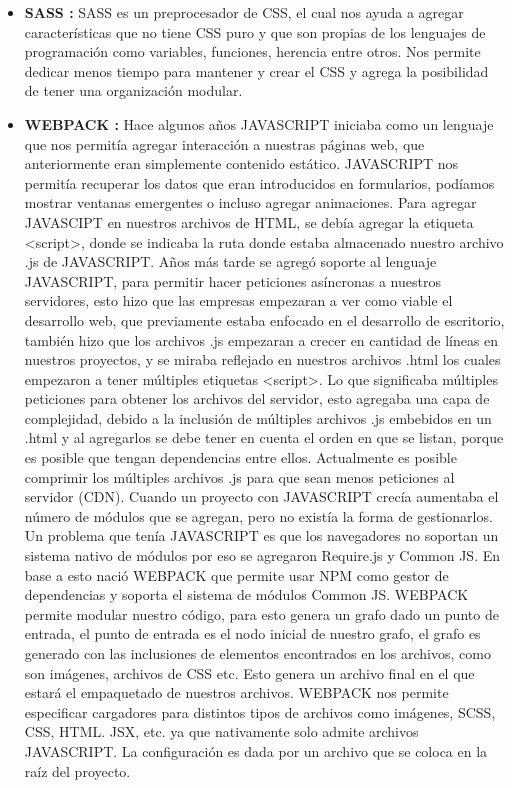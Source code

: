 \begin{itemize}
   \item \textbf{ SASS :} SASS es un preprocesador de CSS, el cual nos ayuda a agregar características que no tiene CSS puro y que son propias de los lenguajes de programación como variables, funciones, herencia entre otros. Nos permite dedicar menos tiempo para mantener y crear el CSS y agrega la posibilidad de tener una organización modular. 
   
   \item \textbf{ WEBPACK :} Hace algunos años JAVASCRIPT iniciaba como un lenguaje que nos permitía agregar interacción a nuestras páginas web, que anteriormente eran simplemente contenido estático.  JAVASCRIPT nos permitía recuperar los datos que eran introducidos en formularios, podíamos mostrar ventanas emergentes o incluso agregar animaciones. Para agregar JAVASCIPT en nuestros archivos de HTML, se debía agregar la etiqueta <script>, donde se indicaba la ruta donde estaba almacenado nuestro archivo .js de JAVASCRIPT.  
Años más tarde se agregó soporte al lenguaje JAVASCRIPT, para permitir hacer peticiones asíncronas a nuestros servidores, esto hizo que las empresas empezaran a ver como viable el desarrollo web, que previamente estaba enfocado en el desarrollo de escritorio, también hizo que los archivos .js empezaran a crecer en cantidad de líneas en nuestros proyectos, y se miraba reflejado en nuestros archivos .html los cuales empezaron a tener múltiples etiquetas <script>. Lo que significaba múltiples peticiones para obtener los archivos del servidor, esto agregaba una capa de complejidad, debido a la inclusión de múltiples archivos .js embebidos en un .html y al agregarlos se debe tener en cuenta el orden en que se listan, porque es posible que tengan dependencias entre ellos. Actualmente es posible comprimir los múltiples archivos .js para que sean menos peticiones al servidor (CDN).  Cuando un proyecto con JAVASCRIPT crecía aumentaba el número de módulos que se agregan, pero no existía la forma de gestionarlos. Un problema que tenía JAVASCRIPT es que los navegadores no soportan un sistema nativo de módulos por eso se agregaron Require.js y Common JS. 
En base a esto nació WEBPACK que permite usar NPM como gestor de dependencias y soporta el sistema de módulos Common JS.
WEBPACK permite modular nuestro código, para esto genera un grafo dado un punto de entrada, el punto de entrada es el nodo inicial de nuestro grafo, el grafo es generado con las inclusiones de elementos encontrados en los archivos, como son imágenes, archivos de CSS etc. Esto genera un archivo final en el que estará el empaquetado de nuestros archivos. 
WEBPACK nos permite especificar cargadores para distintos tipos de archivos como imágenes, SCSS, CSS, HTML. JSX, etc. ya que nativamente solo admite archivos JAVASCRIPT. 
La configuración es dada por un archivo que se coloca en la raíz del proyecto.


\end{itemize}
